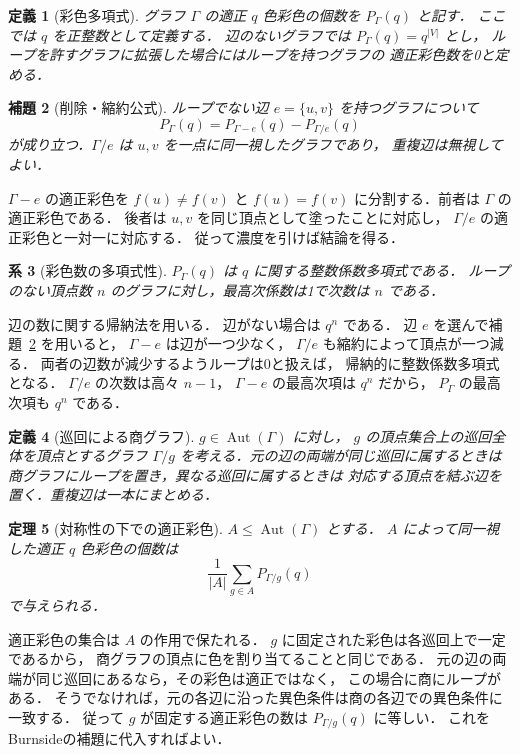 \documentclass[a5paper,10pt,onecolumn]{jsarticle}
\makeatletter
\theoremstyle{mathnotetheorem}
\newtheorem{theorem}{定理}[section]
\newtheorem{definition}[theorem]{定義}
\newtheorem{lemma}[theorem]{補題}
\newtheorem{corollary}[theorem]{系}
\renewcommand{\proofname}{証明}
\renewenvironment{proof}[1][\proofname]{%
  \par\pushQED{\qed}\normalfont\topsep4\p@\@plus2\p@\relax
  \trivlist\item[\hskip\labelsep\bfseries #1]\ignorespaces
}{\popQED\endtrivlist\@endpefalse}
\makeatother
\begin{document}
\begin{definition}[彩色多項式]
グラフ $\Gamma$ の適正 $q$ 色彩色の個数を $P_\Gamma(q)$ と記す．
ここでは $q$ を正整数として定義する．
辺のないグラフでは $P_\Gamma(q)=q^{|V|}$ とし，
ループを許すグラフに拡張した場合にはループを持つグラフの
適正彩色数を0と定める．
\end{definition}

\begin{lemma}[削除・縮約公式]\label{lem:delcontr}
ループでない辺 $e=\{u,v\}$ を持つグラフについて
\[
 P_\Gamma(q)=P_{\Gamma-e}(q)-P_{\Gamma/e}(q)
\]
が成り立つ．$\Gamma/e$ は $u,v$ を一点に同一視したグラフであり，
重複辺は無視してよい．
\end{lemma}
\begin{proof}
$\Gamma-e$ の適正彩色を $f(u)\ne f(v)$ と
$f(u)=f(v)$ に分割する．前者は $\Gamma$ の適正彩色である．
後者は $u,v$ を同じ頂点として塗ったことに対応し，
$\Gamma/e$ の適正彩色と一対一に対応する．
従って濃度を引けば結論を得る．
\end{proof}

\begin{corollary}[彩色数の多項式性]
$P_\Gamma(q)$ は $q$ に関する整数係数多項式である．
ループのない頂点数 $n$ のグラフに対し，最高次係数は1で次数は $n$ である．
\end{corollary}
\begin{proof}
辺の数に関する帰納法を用いる．
辺がない場合は $q^n$ である．
辺 $e$ を選んで補題~\ref{lem:delcontr} を用いると，
$\Gamma-e$ は辺が一つ少なく，
$\Gamma/e$ も縮約によって頂点が一つ減る．
両者の辺数が減少するようループは0と扱えば，
帰納的に整数係数多項式となる．
$\Gamma/e$ の次数は高々 $n-1$，
$\Gamma-e$ の最高次項は $q^n$ だから，
$P_\Gamma$ の最高次項も $q^n$ である．
\end{proof}

\begin{definition}[巡回による商グラフ]
$g\in\operatorname{Aut}(\Gamma)$ に対し，
$g$ の頂点集合上の巡回全体を頂点とするグラフ
$\Gamma/g$ を考える．元の辺の両端が同じ巡回に属するときは
商グラフにループを置き，異なる巡回に属するときは
対応する頂点を結ぶ辺を置く．重複辺は一本にまとめる．
\end{definition}

\begin{theorem}[対称性の下での適正彩色]\label{thm:graphpolya}
$A\le\operatorname{Aut}(\Gamma)$ とする．
$A$ によって同一視した適正 $q$ 色彩色の個数は
\begin{equation}\label{eq:graphpolya}
 \frac1{|A|}\sum_{g\in A}P_{\Gamma/g}(q)
\end{equation}
で与えられる．
\end{theorem}
\begin{proof}
適正彩色の集合は $A$ の作用で保たれる．
$g$ に固定された彩色は各巡回上で一定であるから，
商グラフの頂点に色を割り当てることと同じである．
元の辺の両端が同じ巡回にあるなら，その彩色は適正ではなく，
この場合に商にループがある．
そうでなければ，元の各辺に沿った異色条件は商の各辺での異色条件に一致する．
従って $g$ が固定する適正彩色の数は
$P_{\Gamma/g}(q)$ に等しい．
これをBurnsideの補題に代入すればよい．
\end{proof}
\end{document}
